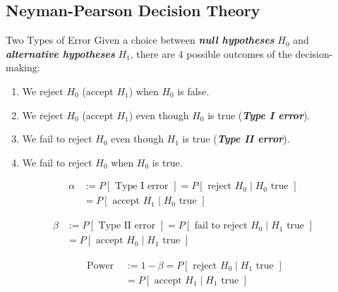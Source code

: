 \documentclass{beamer}
\newcommand{\bb}[1]{\textcolor{antiquefuchsia}{\textbf{\textit{#1}}}}
\begin{document}
\subsection{Neyman-Pearson Decision Theory}
\begin{frame}{Two Types of Error}
Given a choice between \bb{null hypotheses} $H_{0}$ and \bb{alternative hypotheses} $H_{1}$, there are 4 possible outcomes of the decision-making:
\begin{enumerate}
\item We reject $H_{0}$ (accept $H_{1}$) when $H_{0}$ is false.
\item We reject $H_{0}$ (accept $H_{1}$) even though $H_{0}$ is true (\bb{Type I error}).
\item We fail to reject $H_{0}$ even though $H_{1}$ is true (\bb{Type II error}).
\item We fail to reject $H_{0}$ when $H_{0}$ is true.
\end{enumerate}

$$
\begin{aligned}
\alpha &:=P[\text { Type I error }]=P\left[\text { reject } H_{0} \mid H_{0} \text { true }\right] \\
&=P\left[\text { accept } H_{1} \mid H_{0} \text { true }\right]
\end{aligned}
$$

$$
\begin{aligned}
\beta &:=P[\text { Type II error }]=P\left[\text { fail to reject } H_{0} \mid H_{1} \text { true }\right] \\
&=P\left[\text { accept } H_{0} \mid H_{1} \text { true }\right]
\end{aligned}
$$

$$
 \begin{aligned}\text { Power }
&:=1-\beta=P\left[\text { reject } H_{0} \mid H_{1} \text { true }\right] \\
&=P\left[\text { accept } H_{1} \mid H_{1} \text { true }\right]
\end{aligned}
$$

\end{frame}
\end{document}
